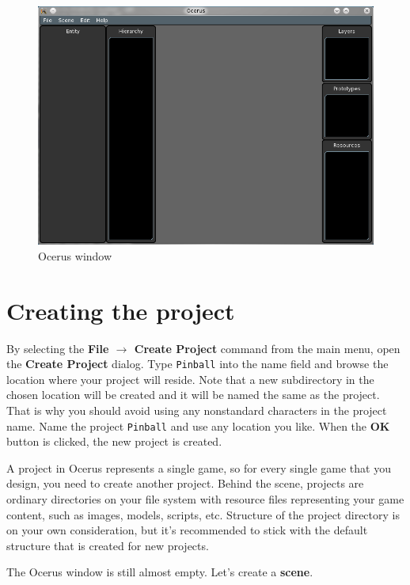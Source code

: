 \documentclass[a4paper,12pt]{article}
\begin{document}
\begin{figure}[ht]
 \begin{center}
  \includegraphics[width=\textwidth]{Initial}
 \end{center}
 \caption{Ocerus window}
 \label{fig:ocerus_initial}
\end{figure}

\section{Creating the project}
By selecting the \textbf{File $\to$ Create Project} command from the main menu, open the \textbf{Create Project} dialog. Type \texttt{Pinball} into the name field and browse the location where your project will reside. Note that a new subdirectory in the chosen location will be created and it will be named the same as the project. That is why you should avoid using any nonstandard characters in the project name. Name the project \texttt{Pinball} and use any location you like. When the \textbf{OK} button is clicked, the new project is created.

A project in Ocerus represents a single game, so for every single game that you design, you need to create another project. Behind the scene, projects are ordinary directories on your file system with resource files representing your game content, such as images, models, scripts, etc. Structure of the project directory is on your own consideration, but it's recommended to stick with the default structure that is created for new projects.

The Ocerus window is still almost empty. Let's create a \textbf{scene}.
\end{document}
